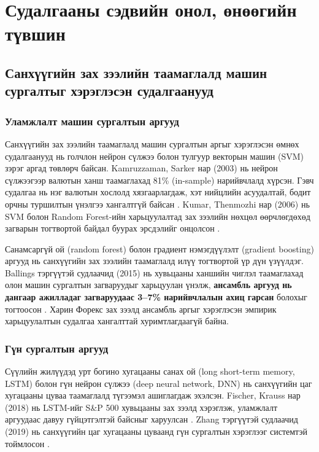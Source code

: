 \chapter{Судалгааны сэдвийн онол, өнөөгийн түвшин}
\label{ch:literature}

\section{Санхүүгийн зах зээлийн таамаглалд машин сургалтыг хэрэглэсэн судалгаанууд}

\subsection{Уламжлалт машин сургалтын аргууд}

Санхүүгийн зах зээлийн таамаглалд машин сургалтын аргыг хэрэглэсэн өмнөх судалгаанууд нь голчлон нейрон сүлжээ болон тулгуур векторын машин (SVM) зэрэг аргад төвлөрч байсан. Kamruzzaman, Sarker нар (2003) нь нейрон сүлжээгээр валютын ханш таамаглахад 81\% (in-sample) нарийвчлалд хүрсэн. Гэвч судалгаа нь нэг валютын хослолд хязгаарлагдаж, хэт нийцлийн асуудалтай, бодит орчны туршилтын үнэлгээ хангалтгүй байсан \cite{kamruzzaman2003forecasting}. Kumar, Thenmozhi нар (2006) нь SVM болон Random Forest-ийн харьцуулалтад зах зээлийн нөхцөл өөрчлөгдөхөд загварын тогтвортой байдал буурах эрсдэлийг онцолсон \cite{kumar2006forecasting}.

Санамсаргүй ой (random forest) болон градиент нэмэгдүүлэлт (gradient boosting) аргууд нь санхүүгийн зах зээлийн таамаглалд илүү тогтвортой үр дүн үзүүлдэг. Ballings тэргүүтэй судлаачид (2015) нь хувьцааны ханшийн чиглэл таамаглахад олон машин сургалтын загваруудыг харьцуулан үнэлж, \textbf{ансамбль аргууд нь дангаар ажилладаг загваруудаас 3--7\% нарийвчлалын ахиц гарсан} болохыг тогтоосон \cite{ballings2015evaluating}. Харин Форекс зах зээлд ансамбль аргыг хэрэглэсэн эмпирик харьцуулалтын судалгаа хангалттай хуримтлагдаагүй байна.

\subsection{Гүн сургалтын аргууд}

Сүүлийн жилүүдэд урт богино хугацааны санах ой (long short-term memory, LSTM) болон гүн нейрон сүлжээ (deep neural network, DNN) нь санхүүгийн цаг хугацааны цуваа таамаглалд түгээмэл ашиглагдаж эхэлсэн. Fischer, Krauss нар (2018) нь LSTM-ийг S\&P 500 хувьцааны зах зээлд хэрэглэж, уламжлалт аргуудаас давуу гүйцэтгэлтэй байсныг харуулсан \cite{fischer2018deep}. Zhang тэргүүтэй судлаачид (2019) нь санхүүгийн цаг хугацааны цуваанд гүн сургалтын хэрэглээг системтэй тоймлосон \cite{zhang2019deep}.

